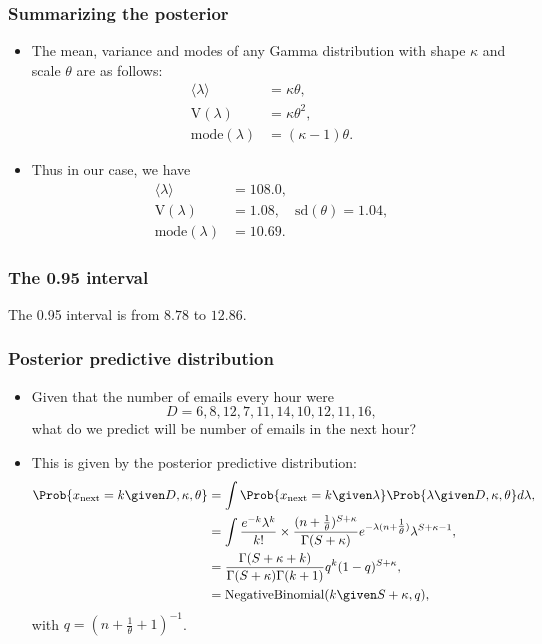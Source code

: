 \documentclass{slides}
\begin{document}
	\begin{frame}
		\frametitle{Summarizing the posterior}
		\begin{itemize}
		\item The mean, variance and modes of any Gamma distribution with shape $\kappa$ and scale $\theta$ are as follows:
			\begin{align*}
				\langle \lambda \rangle &= \kappa\theta,\\
				\mathrm{V}(\lambda) &= \kappa\theta^2,\\
				\textrm{mode}(\lambda) &= (\kappa-1)\theta.
			\end{align*}
		\item Thus in our case, we have
			\begin{align*}
				\langle \lambda \rangle &= 108.0,\\
				\mathrm{V}(\lambda) &= 1.08, \quad\textrm{sd}(\theta) = 1.04,\\
				\textrm{mode}(\lambda) &= 10.69.
			\end{align*}
		\end{itemize}
	\end{frame}

	\begin{frame}
		\frametitle{The 0.95 \hpd interval}

		

		The 0.95 \hpd interval is from $8.78$ to $12.86$.
		
	\end{frame}

	\begin{frame}

		\frametitle{Posterior predictive distribution}

		\begin{itemize}
			\item Given that the number of emails every hour were
				\[D = 6, 8, 12,  7, 11, 14, 10, 12, 11, 16,\]
				what do we predict will be number of emails in the next hour?
			\item This is given by the posterior predictive distribution:
				\begin{align*}
					\Prob{x_{\textrm{next}}= k \given D, \kappa, \theta} &= \int \Prob{x_{\textrm{next}} = k \given \lambda}\Prob{\lambda\given D, \kappa, \theta} d\lambda,\\
					&= \int \frac{e^{-k}\lambda^k}{k!} \times \frac{(n+\tfrac{1}{\theta})^{S+\kappa}}{\Gamma(S+\kappa)} e^{-\lambda(n+\tfrac{1}{\theta})} \lambda^{S+\kappa-1},\\
					&= \frac{\Gamma(S+\kappa+k)}{\Gamma(S+\kappa)\Gamma(k+1)} q^{k} (1-q)^{S+\kappa} ,\\
					&= \textrm{NegativeBinomial}(k\given S+\kappa, q),
				\end{align*}
				with $q = \left(n+\tfrac{1}{\theta} + 1\right)^{-1}$. 

		\end{itemize}

	\end{frame}
\end{document}
